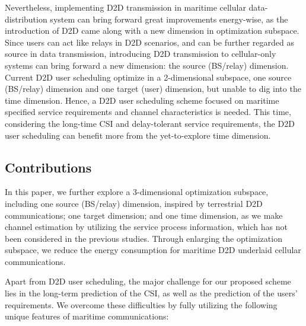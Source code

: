 \documentclass{ieeeaccess}
\begin{document}
Nevertheless, implementing D2D transmission in maritime cellular data-distribution system can bring forward great improvements energy-wise, as the introduction of D2D came along with a new dimension in optimization subspace. Since users can  act like relays in D2D scenarios, and can be further regarded as source in data transmission, introducing D2D transmission to cellular-only systems can bring forward a new dimension: the source (BS/relay) dimension. Current D2D user scheduling optimize in a 2-dimensional subspace, one source (BS/relay) dimension and one target (user) dimension, but unable to dig into the time dimension. Hence, a D2D user scheduling scheme focused on maritime specified service requirements and channel characteristics is needed. This time, considering the long-time CSI and delay-tolerant service requirements, the D2D user scheduling can benefit more from the yet-to-explore time dimension. 



\subsection{Contributions}


In this paper, we further explore a 3-dimensional optimization subspace, including one source (BS/relay) dimension, inspired by terrestrial D2D communications; one target dimension; and one time dimension, as we make channel estimation by utilizing the service process information, which has not been considered in the previous studies. Through enlarging the optimization subspace, we reduce the energy consumption for maritime D2D underlaid cellular communications. 

Apart from D2D user scheduling, the major challenge for our proposed scheme lies in the long-term prediction of the CSI, as well as the prediction of the users' requirements. We overcome these difficulties by fully utilizing the following unique features of maritime communications:
\end{document}
